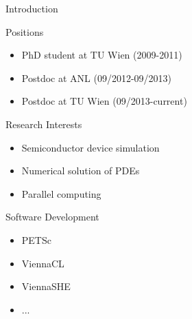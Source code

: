 

%
%

%
%

\begin{frame}{Introduction}

 \begin{minipage}{0.65\textwidth}
 \begin{block}{Positions}
   \begin{itemize}
    \item PhD student at TU Wien (2009-2011)
    \item Postdoc at ANL (09/2012-09/2013)
    \item Postdoc at TU Wien (09/2013-current)
   \end{itemize}
 \end{block}

 \begin{block}{Research Interests}
   \begin{itemize}
    \item Semiconductor device simulation
    \item Numerical solution of PDEs
    \item Parallel computing
   \end{itemize}
 \end{block}

 \begin{block}{Software Development}
   \begin{itemize}
    \item PETSc
    \item ViennaCL
    \item ViennaSHE
    \item ...
   \end{itemize}
 \end{block}
 \end{minipage}

\end{frame}


